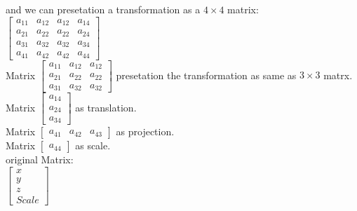 and we can presetation a transformation as a $4\times 4$ matrix:\\
$\begin{bmatrix}
a_{11} & a_{12} & a_{12} & a_{14}\\
a_{21} & a_{22} & a_{22} & a_{24}\\
a_{31} & a_{32} & a_{32} & a_{34}\\
a_{41} & a_{42} & a_{42} & a_{44}
\end{bmatrix}$\\
Matrix $\begin{bmatrix}
a_{11} & a_{12} & a_{12}\\
a_{21} & a_{22} & a_{22}\\
a_{31} & a_{32} & a_{32}
\end{bmatrix}$ presetation the transformation as same as $3\times 3$ matrx.\\
Matrix $\begin{bmatrix}a_{14} \\ a_{24} \\ a_{34} \end{bmatrix}$ as translation.\\
Matrix $\begin{bmatrix}a_{41} & a_{42} & a_{43} \end{bmatrix}$ as projection.\\
Matrix $\begin{bmatrix}a_{44}\end{bmatrix}$ as scale.\\

original Matrix:\\
$\begin{bmatrix}x\\y\\z\\Scale\end{bmatrix}$\\
